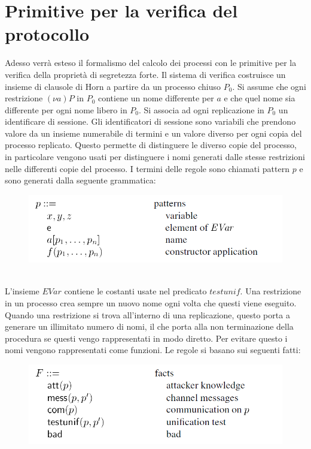 \documentclass[12pt]{report}
\begin{document}
\section*{Primitive per la verifica del protocollo}
Adesso verrà esteso il formalismo del calcolo dei processi con le primitive per la verifica della proprietà di segretezza forte. Il sistema di verifica costruisce un insieme di clausole di Horn a partire da un processo chiuso $P_0$. Si assume che ogni restrizione $(\nu a)P$ in $P_0$ contiene un nome differente per $a$ e che quel nome sia differente per ogni nome libero in $P_0$. Si associa ad ogni replicazione in $P_0$ un identificare di sessione. Gli identificatori di sessione sono variabili che prendono valore da un insieme numerabile di termini e un valore diverso per ogni copia del processo replicato. Questo permette di distinguere le diverso copie del processo, in particolare vengono usati per distinguere i nomi generati dalle stesse restrizioni nelle differenti copie del processo. I termini delle regole sono chiamati pattern $p$ e sono generati dalla seguente grammatica:\\
\begin{figure}[h]
    \centering
    \includegraphics[scale=0.7]{Relazione/Immagini/rule.PNG}
\end{figure}\\
L'insieme $EVar$ contiene le costanti usate nel predicato $testunif$. Una restrizione in un processo crea sempre un nuovo nome ogni volta che questi viene eseguito. Quando una restrizione si trova all'interno di una replicazione, questo porta a generare un illimitato numero di nomi, il che porta alla non terminazione della procedura se questi vengo rappresentati in modo diretto. Per evitare questo i nomi vengono rappresentati come funzioni. Le regole si basano sui seguenti fatti:\\   
\begin{figure}[h]
    \centering
    \includegraphics[scale=0.7]{Relazione/Immagini/fatti.PNG}
\end{figure}\\
\end{document}
